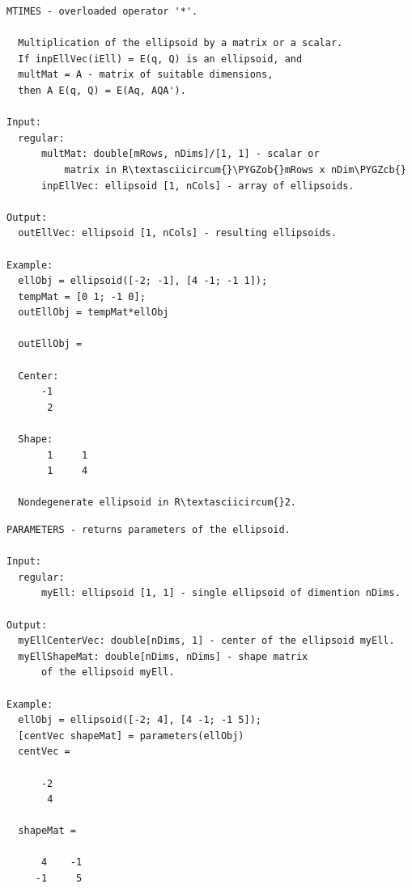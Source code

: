 \documentclass[letterpaper,10pt,english]{sphinxmanual}
\def\PYGZob{\char`\{}
\def\PYGZcb{\char`\}}
\begin{document}
\begin{Verbatim}[commandchars=\\\{\}]
MTIMES - overloaded operator '*'.

  Multiplication of the ellipsoid by a matrix or a scalar.
  If inpEllVec(iEll) = E(q, Q) is an ellipsoid, and
  multMat = A - matrix of suitable dimensions,
  then A E(q, Q) = E(Aq, AQA').

Input:
  regular:
      multMat: double[mRows, nDims]/[1, 1] - scalar or
          matrix in R\textasciicircum{}\PYGZob{}mRows x nDim\PYGZcb{}
      inpEllVec: ellipsoid [1, nCols] - array of ellipsoids.

Output:
  outEllVec: ellipsoid [1, nCols] - resulting ellipsoids.

Example:
  ellObj = ellipsoid([-2; -1], [4 -1; -1 1]);
  tempMat = [0 1; -1 0];
  outEllObj = tempMat*ellObj

  outEllObj =

  Center:
      -1
       2

  Shape:
       1     1
       1     4

  Nondegenerate ellipsoid in R\textasciicircum{}2.
\end{Verbatim}

\begin{Verbatim}[commandchars=\\\{\}]
PARAMETERS - returns parameters of the ellipsoid.

Input:
  regular:
      myEll: ellipsoid [1, 1] - single ellipsoid of dimention nDims.

Output:
  myEllCenterVec: double[nDims, 1] - center of the ellipsoid myEll.
  myEllShapeMat: double[nDims, nDims] - shape matrix
      of the ellipsoid myEll.

Example:
  ellObj = ellipsoid([-2; 4], [4 -1; -1 5]);
  [centVec shapeMat] = parameters(ellObj)
  centVec =

      -2
       4

  shapeMat =

      4    -1
     -1     5
\end{Verbatim}
\end{document}
